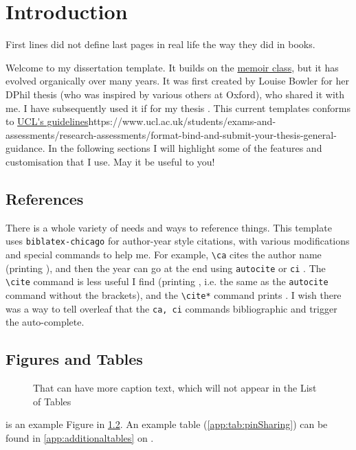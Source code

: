 \chapter{Introduction}
\label{ch:introduction}

\begin{displayquote}
First lines did not define last pages in real life the way they did in books.
\end{displayquote}

Welcome to my dissertation template. It builds on the \href{http://tug.ctan.org/tex-archive/macros/latex/contrib/memoir/memman.pdf}{memoir class}, but it has evolved organically over many years. It was first created by Louise Bowler for her DPhil thesis  (who was inspired by various others at Oxford), who shared it with me. I have subsequently used it if for my thesis . This current templates conforms to \url{UCL's guidelines}{https://www.ucl.ac.uk/students/exams-and-assessments/research-assessments/format-bind-and-submit-your-thesis-general-guidance}. In the following sections I will highlight some of the features and customisation that I use. May it be useful to you!

\section{References}
\label{int:references}

There is a whole variety of needs and ways to reference things. This template uses \texttt{biblatex-chicago} for author-year style citations, with various modifications and special commands to help me. For example, \texttt{\textbackslash ca} cites the author name (printing ), and then the year can go at the end using \texttt{autocite} or \texttt{ci} . The \texttt{\textbackslash cite} command is less useful I find (printing \cite{becker_measuring_2019}, i.e. the same as the \texttt{autocite} command without the brackets), and the \texttt{\textbackslash cite*} command prints \cite*{becker_measuring_2019}. I wish there was a way to tell overleaf that the \texttt{ca, ci} commands bibliographic and trigger the auto-complete. 

\section{Figures and Tables}
\label{int:figures}

\begin{figure}[!htb]
    \centering
    \caption[A placeholder caption]{That can have more caption text, which will not appear in the List of Tables}
    \label{int:fig:exampleCaption}
\end{figure}

 is an example Figure in \cref{int:figures}. An example table (\cref{app:tab:pinSharing}) can be found in \cref{app:additionaltables} on .


